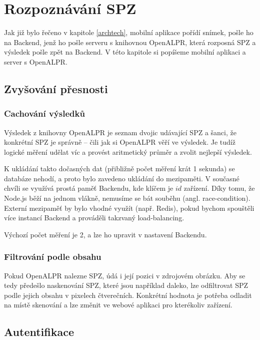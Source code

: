 
\chapter{Rozpoznávání SPZ}

Jak již bylo řečeno v kapitole \ref{archtech}, mobilní aplikace pořídí snímek,
pošle ho na Backend, jenž ho pošle serveru s knihovnou OpenALPR, která
rozposná SPZ a výsledek pošle zpět na Backend. V této kapitole si popíšeme
mobilní aplikaci a server s OpenALPR.

\section{Zvyšování přesnosti}

\subsection{Cachování výsledků}

Výsledek z knihovny OpenALPR je seznam dvojic udávající SPZ a šanci, že konkrétní SPZ je správně --
čili jak si OpenALPR věří ve výsledek. Je tudíž logické měření udělat víc a provést aritmetický průměr a
zvolit nejlepší výsledek.

K ukládání takto dočasných dat (přibližně počet měření krát 1 sekunda) se databáze nehodí, a proto
bylo zavedeno ukládání do mezipaměti. V současné chvíli se využívá prostá paměť Backendu,
kde klíčem je $id$ zařízení. Díky tomu, že Node.js běží na jednom vlákně, nemusíme se bát souběhu
(angl. race-condition). Externí mezipaměť by bylo vhodné využít (např. Redis), pokud bychom spouštěli více
instancí Backend a prováděli takzvaný load-balancing.

Výchozí počet měření je 2, a lze ho upravit v nastavení Backendu.

\subsection{Filtrování podle obsahu}

Pokud OpenALPR nalezne SPZ, údá i její pozici v zdrojovém obrázku.
Aby se tedy předešlo naskenování SPZ, které jsou například daleko, lze odfiltrovat SPZ
podle jejich obsahu v pixelech čtverečních. Konkrétní hodnota je potřeba odladit na místě skenování a
lze změnit ve webové aplikaci pro kterékoliv zařízení.

\section{Autentifikace}

